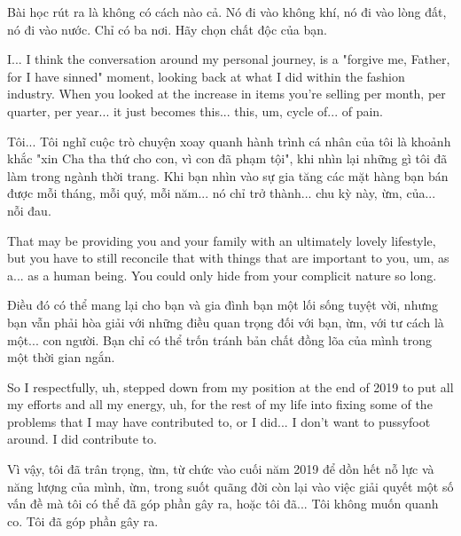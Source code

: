 \documentclass[a4paper]{article}
\begin{document}
	\begin{vietnamese-v2}
		[Eric] Bài học rút ra là không có cách nào cả.
		Nó đi vào không khí, nó đi vào lòng đất, nó đi vào nước.
		Chỉ có ba nơi.
		Hãy chọn chất độc của bạn.
	\end{vietnamese-v2}
	
	I... I think the conversation around my personal journey, is a "forgive me, Father, for I have sinned" moment, looking back at what I did within the fashion industry.
	When you looked at the increase in items you're selling per month, per quarter, per year... it just becomes this... this, um, cycle of... of pain.
	
	\begin{vietnamese-v2}
		Tôi... Tôi nghĩ cuộc trò chuyện xoay quanh hành trình cá nhân của tôi là khoảnh khắc "xin Cha tha thứ cho con, vì con đã phạm tội", khi nhìn lại những gì tôi đã làm trong ngành thời trang.
		Khi bạn nhìn vào sự gia tăng các mặt hàng bạn bán được mỗi tháng, mỗi quý, mỗi năm... nó chỉ trở thành... chu kỳ này, ừm, của... nỗi đau.
	\end{vietnamese-v2}
	
	That may be providing you and your family with an ultimately lovely lifestyle, but you have to still reconcile that with things that are important to you, um, as a... as a human being.
	You could only hide from your complicit nature so long.
	
	\begin{vietnamese-v2}
		Điều đó có thể mang lại cho bạn và gia đình bạn một lối sống tuyệt vời, nhưng bạn vẫn phải hòa giải với những điều quan trọng đối với bạn, ừm, với tư cách là một... con người.
		Bạn chỉ có thể trốn tránh bản chất đồng lõa của mình trong một thời gian ngắn.
	\end{vietnamese-v2}
	
	
	So I respectfully, uh, stepped down from my position at the end of 2019 to put all my efforts and all my energy, uh, for the rest of my life into fixing some of the problems that I may have contributed to, or I did...
	I don't want to pussyfoot around. I did contribute to.
	
	\begin{vietnamese-v2}
		Vì vậy, tôi đã trân trọng, ừm, từ chức vào cuối năm 2019 để dồn hết nỗ lực và năng lượng của mình, ừm, trong suốt quãng đời còn lại vào việc giải quyết một số vấn đề mà tôi có thể đã góp phần gây ra, hoặc tôi đã...
		Tôi không muốn quanh co. Tôi đã góp phần gây ra.
	\end{vietnamese-v2}
	
\end{document}
